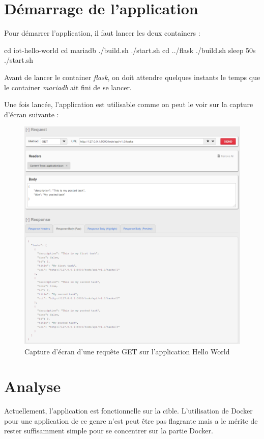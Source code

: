\documentclass[11pt,a4paper,oneside]{report}
\begin{document}
\section{Démarrage de l'application}
Pour démarrer l'application, il faut lancer les deux containers :
\begin{bashcode}
cd iot-hello-world
cd mariadb
./build.sh
./start.sh
cd ../flask
./build.sh
sleep 50s
./start.sh
\end{bashcode}

Avant de lancer le container \textit{flask}, on doit attendre quelques instants le temps que le container \textit{mariadb} ait fini de se lancer.

Une fois lancée, l'application est utilisable comme on peut le voir sur la capture d'écran suivante :

\begin{figure}[H]
\centering
\includegraphics[scale=0.49]{img/todo-list-screenshot.png}
\caption{Capture d'écran d'une requête GET sur l'application Hello World}
\end{figure}


\section{Analyse}
Actuellement, l'application est fonctionnelle sur la cible. L'utilisation de Docker pour une application de ce genre n'est peut être pas flagrante mais a le mérite de rester suffisamment simple pour se concentrer sur la partie Docker.
\end{document}
